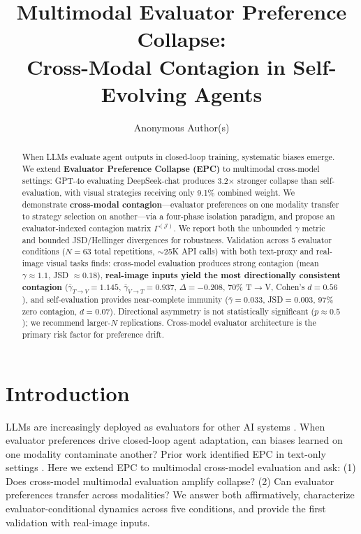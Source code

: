 \documentclass[letterpaper,10pt,twocolumn]{article}
\title{Multimodal Evaluator Preference Collapse: \\Cross-Modal Contagion in Self-Evolving Agents}
\author{Anonymous Author(s)}
\date{}
\begin{document}
\maketitle

\begin{abstract}
When LLMs evaluate agent outputs in closed-loop training, systematic biases emerge. We extend \textbf{Evaluator Preference Collapse (EPC)} to multimodal cross-model settings: GPT-4o evaluating DeepSeek-chat produces 3.2$\times$ stronger collapse than self-evaluation, with visual strategies receiving only 9.1\% combined weight. We demonstrate \textbf{cross-modal contagion}---evaluator preferences on one modality transfer to strategy selection on another---via a four-phase isolation paradigm, and propose an evaluator-indexed contagion matrix $\Gamma^{(\mathcal{J})}$. We report both the unbounded $\gamma$ metric and bounded JSD/Hellinger divergences for robustness. Validation across 5 evaluator conditions ($N{=}63$ total repetitions, $\sim$25K API calls) with both text-proxy and real-image visual tasks finds: cross-model evaluation produces strong contagion (mean $\gamma{\approx}1.1$, JSD ${\approx}0.18$), \textbf{real-image inputs yield the most directionally consistent contagion} ($\bar{\gamma}_{T\to V}{=}1.145$, $\bar{\gamma}_{V\to T}{=}0.937$, $\Delta{=}{-}0.208$, 70\% T$\to$V, Cohen's $d{=}0.56$), and self-evaluation provides near-complete immunity ($\bar{\gamma}{=}0.033$, JSD${=}0.003$, 97\% zero contagion, $d{=}0.07$). Directional asymmetry is not statistically significant ($p{\approx}0.5$); we recommend larger-$N$ replications. Cross-model evaluator architecture is the primary risk factor for preference drift.
\end{abstract}

\section{Introduction}
LLMs are increasingly deployed as evaluators for other AI systems \cite{zheng2023judging}. When evaluator preferences drive closed-loop agent adaptation, can biases learned on one modality contaminate another? Prior work identified EPC in text-only settings \cite{liu2026epc}. Here we extend EPC to multimodal cross-model evaluation and ask: (1) Does cross-model multimodal evaluation amplify collapse? (2) Can evaluator preferences transfer across modalities? We answer both affirmatively, characterize evaluator-conditional dynamics across five conditions, and provide the first validation with real-image inputs.
\end{document}
